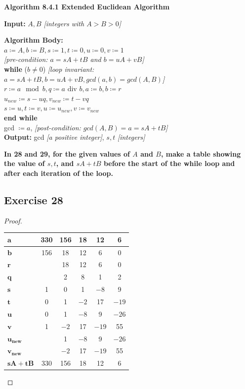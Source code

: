 \documentclass[14pt]{extarticle}
\newcommand{\cy}{\color{cyan}}
\begin{document}
\begin{tcolorbox}[colframe=cyan]
{\bf \cy Algorithm 8.4.1 Extended Euclidean Algorithm}

{\bf Input:} $A, B$ {\it [integers with \(A > B > 0\)]}

\begin{tabbing}
{\bf Algorithm Body:} \\
\(a \coloneqq A, b \coloneqq B, s \coloneqq 1, t \coloneqq 0, u \coloneqq 0, v \coloneqq 1\) \\
{\it [pre-condition: \(a = sA + tB\) and \(b = uA + vB\)]} \\
{\bf wh}\={\bf ile} (\(b \neq 0\)) {\it [loop invariant: \(a = sA + tB, b = uA + vB, gcd(a,b) = gcd(A,B)\)]} \\
        \> \(r \coloneqq a \mod b, q \coloneqq a \text{ div } b, a \coloneqq b, b \coloneqq r\) \\
        \> \(u_{new} \coloneqq s-uq, v_{new} \coloneqq t-vq\) \\
        \> \(s \coloneqq u, t \coloneqq v, u \coloneqq u_{new}, v \coloneqq v_{new}\) \\
{\bf end while} \\
gcd \(\coloneqq a\), {\it [post-condition: \(gcd(A,B) = a = sA + tB\)]} \\
{\bf Output:} gcd {\it [a positive integer]}, \(s,t\) {\it [integers]}
\end{tabbing}
\end{tcolorbox}

{\bf \cy In 28 and 29, for the given values of $A$ and $B$, make a table showing the value of \(s, t\), and \(sA + tB\) 
before the start of the while loop and after each iteration of the loop.}

\subsection{Exercise 28}
\begin{proof}
\begin{center}
\begin{tabular}{|l|c|c|c|c|c|}
\hline
\(\bm{a}\) & 330 & 156 & 18 & 12 & 6 \\
\hline
\(\bm{b}\) & 156 & 18 & 12 & 6 & 0 \\
\hline
\(\bm{r}\) & & 18 & 12 & 6 & 0 \\
\hline
\(\bm{q}\) & & 2 & 8 & 1 & 2 \\
\hline
\(\bm{s}\) & 1 & 0 & 1 & $-8$ & 9 \\
\hline
\(\bm{t}\) & 0 & 1 & $-2$ & 17 & $-19$ \\
\hline
\(\bm{u}\) & 0 & 1 & $-8$ & 9 & $-26$ \\
\hline
\(\bm{v}\) & 1 & $-2$ & 17 & $-19$ & 55 \\
\hline
\(\bm{u_{new}}\) & & 1 & $-8$ & 9 & $-26$ \\
\hline
\(\bm{v_{new}}\) & & $-2$ & 17 & $-19$ & 55 \\
\hline
\(\bm{sA+tB}\) & 330 & 156 & 18 & 12 & 6 \\
\hline
\end{tabular}
\end{center}
\end{proof}
\end{document}
